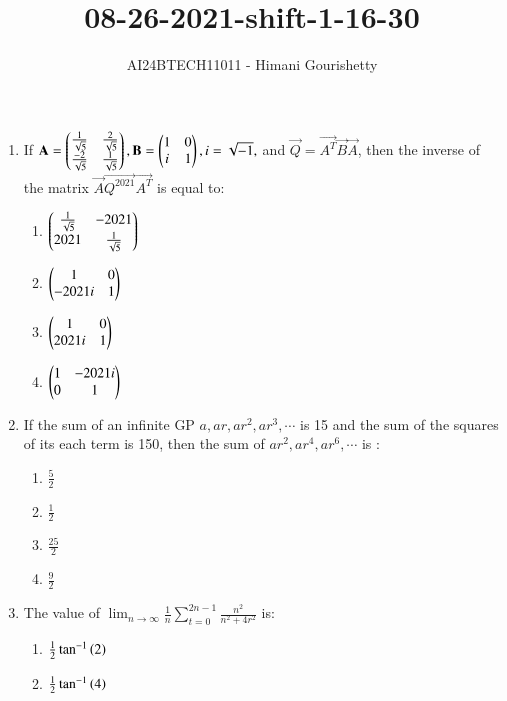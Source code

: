 \documentclass[journal,12pt,onecolumn]{IEEEtran}
\theoremstyle{remark}
\begin{document}

\vspace{3cm}

\title{08-26-2021-shift-1-16-30}
\author{AI24BTECH11011 - Himani Gourishetty}
\maketitle
\bigskip

\renewcommand{\thefigure}{\theenumi}
\renewcommand{\thetable}{\theenumi}
\begin{enumerate}
        \item If $\mathbf{A}=\begin{pmatrix}\frac{1}{\sqrt{5}}&\frac{2}{\sqrt{5}}\\\frac{-2}{\sqrt{5}}&\frac{1}{\sqrt{5}}\end{pmatrix},\mathbf{B}=\begin{pmatrix}1&0\\i&1\end{pmatrix},i=\sqrt{-1},$ and $\vec{Q}=\vec{A^{T}}\vec{B}\vec{A}$, then the inverse of the matrix $\vec{A}\vec{Q^{2021}}\vec{A^{T}}$ is equal to:
        \begin{enumerate}
            \item $\begin{pmatrix}\frac{1}{\sqrt{5}}&-2021\\2021&\frac{1}{\sqrt{5}}\end{pmatrix}$
            \item $\begin{pmatrix}1&0\\-2021i&1\end{pmatrix}$
            \item $\begin{pmatrix}1&0\\2021i&1\end{pmatrix}$
            \item $\begin{pmatrix}1&-2021i\\0&1\end{pmatrix}$
        \end{enumerate}
        \item If the sum of an infinite GP $a, ar, ar^{2}, ar^{3},\cdots$ is 15 and the sum of the squares of its each term is 150, then the sum of $ar^{2}, ar^{4}, ar^{6}, \cdots$ is :
        \begin{enumerate}
            \item $\frac{5}{2}$
            \item $\frac{1}{2}$
            \item $\frac{25}{2}$
            \item $\frac{9}{2}$
        \end{enumerate}
        \item The value of $\lim_{n \to \infty}\frac{1}{n}\sum_{t=0}^{2n-1}\frac{n^{2}}{n^{2}+4r^{2}}$ is:
        \begin{enumerate}
            \item $\frac{1}{2}\tan^{-1}\left(2\right)$
            \item $\frac{1}{2}\tan^{-1}\left(4\right)$

\end{enumerate}
\end{enumerate}
\end{document}
